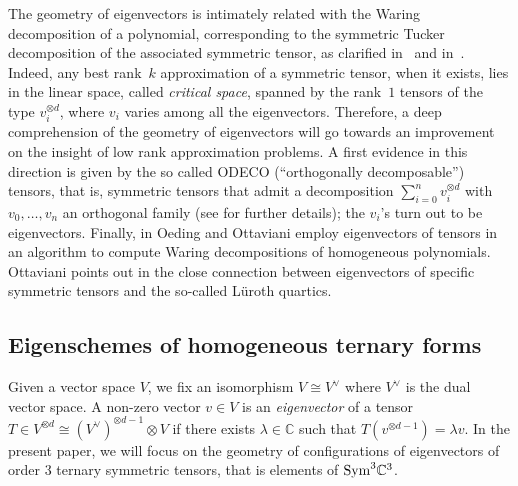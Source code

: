 \documentclass[a4paper, 11pt, reqno]{amsart}
\theoremstyle{plain}
\theoremstyle{definition}
\newcommand{\C}{\mathbb{C}}
\begin{document}
The geometry of eigenvectors is intimately related with the Waring decomposition of a polynomial, 
corresponding to the symmetric Tucker decomposition of the associated symmetric tensor, 
as clarified in~\cite{DOT} and in~\cite{Ott}. 
Indeed, any best rank~$k$ approximation of a symmetric tensor, when it exists, lies in the linear space, 
called \emph{critical space}, spanned by the rank~$1$ tensors of the type $v_i^{\otimes d}$, where $v_i$ varies among all the eigenvectors. 
Therefore, a deep comprehension of the geometry of eigenvectors will
go towards an improvement on the insight of low rank approximation problems.
A first evidence in this direction is given by the so called ODECO (``orthogonally decomposable'') tensors, 
that is, symmetric tensors that admit a decomposition
$\sum _{i=0}^n v_i ^{\otimes d}$ with $v_0, \dotsc, v_n$ an orthogonal family (see \cite{Rob, BDHE} for further details);
the $v_i$'s turn out to be eigenvectors.
Finally, in \cite{OO} Oeding and Ottaviani employ eigenvectors of tensors in an algorithm to compute Waring decompositions of homogeneous polynomials.
Ottaviani points out in \cite[Section~8]{Ottaviani24} the close connection between eigenvectors of specific symmetric tensors and the so-called L\"uroth quartics. 

\subsection*{Eigenschemes of homogeneous ternary forms}
Given a vector space $V$, we fix an isomorphism $V \cong V^\vee$ where $V^\vee$ is the dual vector space.
A non-zero vector $v \in V$ is an {\it eigenvector} of a tensor
 $T\in V ^{\otimes d} \cong ( V^\vee)^{\otimes d-1}\otimes V$ if there exists $\lambda\in \C$ such that 
 $T(v^{\otimes d-1})= \lambda v$. 
In the present paper, we will focus on the geometry of configurations of eigenvectors of order $3$ ternary symmetric tensors,
that is elements of ${\rm Sym}^3 \C^3$. 
\end{document}
